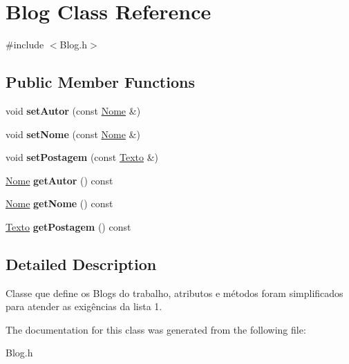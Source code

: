 \hypertarget{classBlog}{}\section{Blog Class Reference}
\label{classBlog}


{\ttfamily \#include $<$Blog.\+h$>$}

\subsection*{Public Member Functions}
\begin{DoxyCompactItemize}
\item 
void {\bfseries set\+Autor} (const \hyperlink{classNome}{Nome} \&)\hypertarget{classBlog_a8c4a11ec488728edcceea9bd73fb87ff}{}\label{classBlog_a8c4a11ec488728edcceea9bd73fb87ff}

\item 
void {\bfseries set\+Nome} (const \hyperlink{classNome}{Nome} \&)\hypertarget{classBlog_ad265bdd72e9ff4dfa9356222977bfba4}{}\label{classBlog_ad265bdd72e9ff4dfa9356222977bfba4}

\item 
void {\bfseries set\+Postagem} (const \hyperlink{classTexto}{Texto} \&)\hypertarget{classBlog_a882cff7dd990e3109a63c3f4e8d31c80}{}\label{classBlog_a882cff7dd990e3109a63c3f4e8d31c80}

\item 
\hyperlink{classNome}{Nome} {\bfseries get\+Autor} () const \hypertarget{classBlog_adb16dc7ff24d32474be0daa324693157}{}\label{classBlog_adb16dc7ff24d32474be0daa324693157}

\item 
\hyperlink{classNome}{Nome} {\bfseries get\+Nome} () const \hypertarget{classBlog_a5bce5a51354c5e786eaeaab50c358854}{}\label{classBlog_a5bce5a51354c5e786eaeaab50c358854}

\item 
\hyperlink{classTexto}{Texto} {\bfseries get\+Postagem} () const \hypertarget{classBlog_aad509fda905a26b2e76eb2554ceb3b7e}{}\label{classBlog_aad509fda905a26b2e76eb2554ceb3b7e}

\end{DoxyCompactItemize}


\subsection{Detailed Description}
Classe que define os Blogs do trabalho, atributos e métodos foram simplificados para atender as exigências da lista 1. 

The documentation for this class was generated from the following file\+:\begin{DoxyCompactItemize}
\item 
Blog.\+h\end{DoxyCompactItemize}
